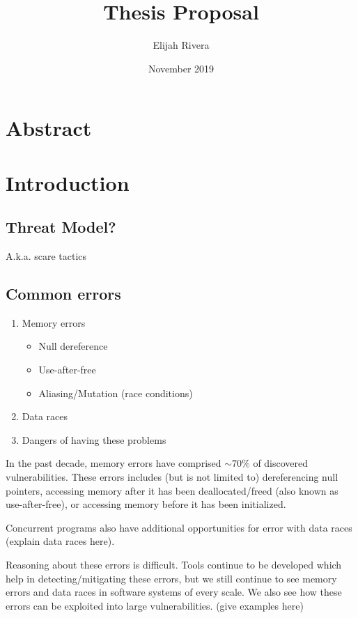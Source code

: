 \documentclass{article}
\title{Thesis Proposal}
\author{Elijah Rivera}
\date{November 2019}
\begin{document}
\maketitle

\section{Abstract}

\section{Introduction}
\subsection{Threat Model?}
A.k.a. scare tactics

\subsection{Common errors}

\begin{enumerate}
    \item Memory errors
        \begin{itemize}
            \item Null dereference
            \item Use-after-free
            \item Aliasing/Mutation (race conditions)
        \end{itemize}
    \item Data races
    \item Dangers of having these problems
\end{enumerate}

In the past decade, memory errors have comprised $\sim70\%$ of discovered vulnerabilities. These errors includes (but is not limited to) dereferencing null pointers, accessing memory after it has been deallocated/freed (also known as use-after-free), or accessing memory before it has been initialized. 

Concurrent programs also have additional opportunities for error with data races (explain data races here).

Reasoning about these errors is difficult. Tools continue to be developed which help in detecting/mitigating these errors, but we still continue to see memory errors and data races in software systems of every scale. We also see how these errors can be exploited into large vulnerabilities. (give examples here)
\end{document}
